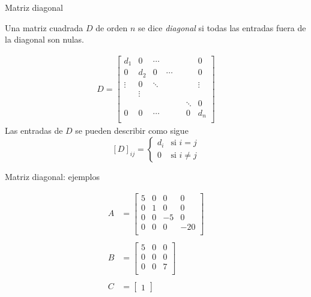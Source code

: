 \documentclass[handout]{beamer} %
\renewcommand{\_}[1]{_{\left[ #1 \right]}}
\renewcommand{\^}[1]{^{\left[ #1 \right]}}
\begin{document}
\begin{frame}{Matriz diagonal}
	
	Una matriz cuadrada $D$ de orden $n$ se dice \textit{diagonal} si todas las entradas fuera de la diagonal son nulas.
	
	\pause
	\begin{align*}
		D=
		\left[
		\begin{array}{ccccccc}
			d_1 & 0 & \cdots & & &  & 0\\ 
			0 & d_2 & 0& \cdots & &  & 0\\
			\vdots & 0 & \ddots & & &  & \vdots\\
			& \vdots &  & & & &  \\
			& &  & & &  \ddots&0\\
			0 & 0 & \cdots & & & 0 & d_{n}\\ 
		\end{array}
		\right]
	\end{align*}
	\pause
	Las entradas de $D$ se pueden describir como sigue 
	$$
	[D]_{ij}=\begin{cases}
		d_i&\mbox{si $i=j$}\\ 
		0&\mbox{si $i\neq j$}
	\end{cases}
	$$
\end{frame}


\begin{frame}{Matriz diagonal:  ejemplos }
	
	\begin{align*}
		A&=
		\begin{bmatrix}
			5 & 0 & 0 & 0\\ 
			0 & 1 & 0& 0\\
			0&0 & -5 & 0 \\
			0&0& 0 & -20 \\
		\end{bmatrix}
		\\
	&
		\\
		B&=
		\begin{bmatrix}
			5 &  0 & 0\\ 
			0 & 0  & 0\\
			0& 0 & 7 \\
		\end{bmatrix}
		\\
	&
		\\
		C&=
		\begin{bmatrix}
			1
		\end{bmatrix}
	\end{align*}

	\vskip 1cm
\end{frame}
\end{document}
